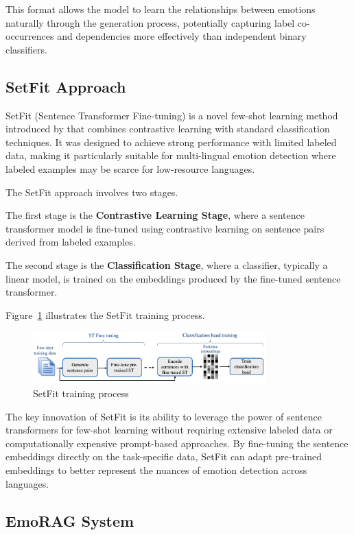 \documentclass[a4paper,12pt]{extarticle}
\begin{document}
This format allows the model to learn the relationships between emotions naturally through the generation process, potentially capturing label co-occurrences and dependencies more effectively than independent binary classifiers.

\subsection{SetFit Approach}

SetFit (Sentence Transformer Fine-tuning) is a novel few-shot learning method introduced by \cite{tunstall2022efficient} that combines contrastive learning with standard classification techniques. It was designed to achieve strong performance with limited labeled data, making it particularly suitable for multi-lingual emotion detection where labeled examples may be scarce for low-resource languages.

The SetFit approach involves two stages. 

The first stage is the \textbf{Contrastive Learning Stage}, where a sentence transformer model is fine-tuned using contrastive learning on sentence pairs derived from labeled examples. 

The second stage is the \textbf{Classification Stage}, where a classifier, typically a linear model, is trained on the embeddings produced by the fine-tuned sentence transformer.

Figure~\ref{fig:setfit_training} illustrates the SetFit training process.

\begin{figure}[h]
    \centering
    \includegraphics[width=0.8\textwidth]{setfit.png}
    \caption{SetFit training process}
    \label{fig:setfit_training}
\end{figure}

The key innovation of SetFit is its ability to leverage the power of sentence transformers for few-shot learning without requiring extensive labeled data or computationally expensive prompt-based approaches. By fine-tuning the sentence embeddings directly on the task-specific data, SetFit can adapt pre-trained embeddings to better represent the nuances of emotion detection across languages.

\subsection{EmoRAG System}
\end{document}
